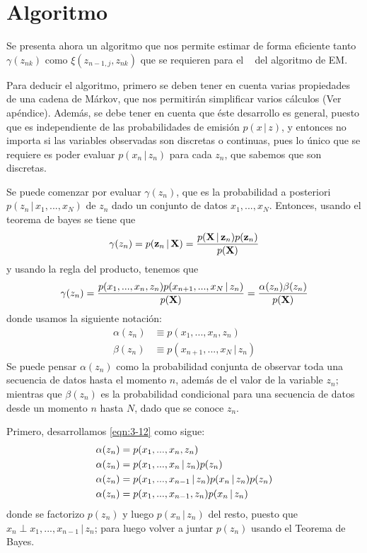 \section{Algoritmo \abf}

Se presenta ahora un algoritmo que nos permite estimar de forma eficiente tanto $\gamma(z_{nk})$ como $\xi(z_{n-1, j}, z_{nk})$ que se requieren para el \estep~ del algoritmo de EM.

Para deducir el algoritmo, primero se deben tener en cuenta varias propiedades de una cadena de Márkov, que nos permitirán simplificar varios cálculos (Ver apéndice). Además, se debe tener en cuenta que éste desarrollo es general, puesto que es independiente de las probabilidades de emisión $p(x \,|\, z)$, y entonces no importa si las variables observadas son discretas o continuas, pues lo único que se requiere es poder evaluar $p(x_n \,|\, z_n)$ para cada $z_n$, que sabemos que son discretas.

Se puede comenzar por evaluar $\gamma(z_n)$, que es la probabilidad a posteriori $p(z_n \,|\, x_1, ..., x_N)$ de $z_n$ dado un conjunto de datos $x_1, ..., x_N$. Entonces, usando el teorema de bayes se tiene que
\begin{equation}
  \gamma(z_n) = p(\textbf{z}_n \,|\, \textbf{X}) = 
    \frac{p(\textbf{X} \,|\, \textbf{z}_n) p(\textbf{z}_n)}{p(\textbf{X})} 
  \label{eqn:3-10}
\end{equation}
y usando la regla del producto, tenemos que
\begin{equation}
  \gamma(z_n) = \frac{
    p(x_1, ..., x_n, z_n) p(x_{n+1}, ..., x_N \,|\, z_n) 
    }
    {p(\textbf{X})} = \frac{\alpha(z_n) \beta(z_n)}{p(\textbf{X})}
  \label{eqn:3-11}
\end{equation}
donde usamos la siguiente notación:
\begin{align}
  \alpha(z_n) &\equiv p(x_1, ..., x_n, z_n) 
\label{eqn:3-12} \\
  \beta(z_n) &\equiv p(x_{n+1}, ..., x_N \,|\, z_n) 
  \label{eqn:3-13}
\end{align}
Se puede pensar $\alpha(z_n)$ como la probabilidad conjunta de observar toda una secuencia de datos hasta el momento $n$, además de el valor de la variable $z_n$; mientras que $\beta(z_n)$ es la probabilidad condicional para una secuencia de datos desde un momento $n$ hasta $N$, dado que se conoce $z_n$. 

Primero, desarrollamos \eqref{eqn:3-12} como sigue:
\begin{align}
  \alpha(z_n) &= p(x_1, ..., x_n, z_n)  
  \notag \\ 
  \alpha(z_n) &= p(x_1, ..., x_n \,|\, z_n)  p(z_n) 
  \notag \\ 
  \alpha(z_n) &= p(x_1, ..., x_{n-1} \,|\, z_n) p(x_n \,|\, z_n)  p(z_n) 
  \notag \\ 
  \alpha(z_n) &= p(x_1, ..., x_{n-1}, z_n) p(x_n \,|\, z_n)
  \notag
\end{align}
donde se factorizo $p(z_n)$ y luego $p(x_n \,|\, z_n)$ del resto, puesto que $x_n \perp x_1, ... , x_{n-1} \,|\, z_n$; para luego volver a juntar $p(z_n)$
usando el Teorema de Bayes.

